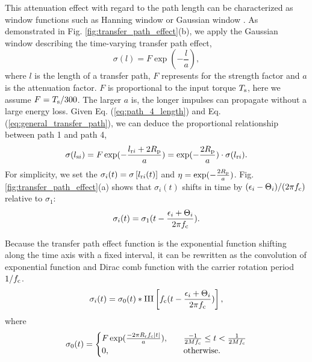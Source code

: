 \documentclass[a4paper,fleqn]{cas-sc}%
\begin{document}
\par This attenuation effect with regard to the path length can be characterized as window functions such as Hanning window or Gaussian window \cite{Mark2009}. As demonstrated in Fig. \ref{fig:transfer_path_effect}(b), we apply the Gaussian window describing the time-varying transfer path effect,
\begin{equation}
    \sigma(l)=F\exp\left(-\frac{l}{a}\right),\label{eq:general_transfer_path}
\end{equation}
where $l$ is the length of a transfer path, $F$ represents for the strength factor and $a$ is the attenuation factor. $F$ is proportional to the input torque $T_{\rm s}$, here we assume $F=T_{\rm s}/300$. The larger $a$ is, the longer impulses can propagate without a large energy loss. Given Eq. (\ref{eq:path_4_length}) and Eq. (\ref{eq:general_transfer_path}), we can deduce the proportional relationship between path 1 and path 4,
\begin{equation}
    \sigma (l_{{\rm s}i})=F\exp(-\frac{l_{{\rm r}i}+2 R_{\rm p}}{a})=\exp(-\frac{2 R_{\rm p}}{a}) \cdot \sigma(l_{{\rm r}i}).
\end{equation}
For simplicity, we set the $\sigma_i(t)=\sigma\left[l_{{\rm r}i}(t)\right]$ and $\eta=\exp(-\frac{2 R_{\rm p}}{a})$. Fig. \ref{fig:transfer_path_effect}(a) shows that $\sigma_{i}(t)$ shifts in time by $(\epsilon_i-\Theta_i)/(2 \pi f_{\rm c})$ relative to $\sigma_1$:
\begin{equation}
    \sigma_{i}(t)=\sigma_{1}(t-\frac{\epsilon_i+\Theta_i}{2 \pi f_{\rm c}}).
\end{equation}
\par Because the transfer path effect function is the exponential function shifting along the time axis with a fixed interval, it can be rewritten as the convolution of exponential function and Dirac comb function with the carrier rotation period $1/f_{\rm c}$.
\begin{equation}
    \sigma_i(t)=\sigma_0(t) \ast \operatorname{III}\left[f_{\rm c} (t - \frac{\epsilon_i+\Theta_i}{2 \pi f_{\rm c}})\right],\label{eq:transfer_path_convolution_form}
\end{equation}
where
\begin{equation}
    \sigma_0(t)=\begin{cases}F \exp(\frac{- 2 \pi R_{\rm r} f_{\rm c} \left|t\right|}{a}),\quad &\frac{-1}{2 M f_{\rm c}} \leq t < \frac{1}{2 M f_{\rm c}}\\
        0, &\text{otherwise}.
    \end{cases}\label{eq:tranfer_path_time_shape}
\end{equation}
\end{document}
